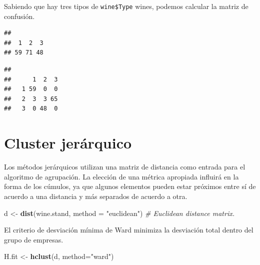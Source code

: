 \documentclass[]{book}
\newenvironment{Shaded}{\begin{snugshade}}{\end{snugshade}}
\newcommand{\KeywordTok}[1]{\textcolor[rgb]{0.13,0.29,0.53}{\textbf{#1}}}
\newcommand{\DataTypeTok}[1]{\textcolor[rgb]{0.13,0.29,0.53}{#1}}
\newcommand{\DecValTok}[1]{\textcolor[rgb]{0.00,0.00,0.81}{#1}}
\newcommand{\StringTok}[1]{\textcolor[rgb]{0.31,0.60,0.02}{#1}}
\newcommand{\CommentTok}[1]{\textcolor[rgb]{0.56,0.35,0.01}{\textit{#1}}}
\newcommand{\OperatorTok}[1]{\textcolor[rgb]{0.81,0.36,0.00}{\textbf{#1}}}
\newcommand{\NormalTok}[1]{#1}
\begin{document}
Sabiendo que hay tres tipos de \texttt{wine\$Type} wines, podemos
calcular la matriz de confusión.

\begin{Shaded}
\end{Shaded}

\begin{verbatim}
## 
##  1  2  3 
## 59 71 48
\end{verbatim}

\begin{Shaded}
\end{Shaded}

\begin{verbatim}
##    
##      1  2  3
##   1 59  0  0
##   2  3  3 65
##   3  0 48  0
\end{verbatim}

\section{Cluster jerárquico}\label{cluster-jeruxe1rquico}

Los métodos jerárquicos utilizan una matriz de distancia como entrada
para el algoritmo de agrupación. La elección de una métrica apropiada
influirá en la forma de los cúmulos, ya que algunos elementos pueden
estar próximos entre sí de acuerdo a una distancia y más separados de
acuerdo a otra.

\begin{Shaded}
\begin{Highlighting}[]
\NormalTok{d <-}\StringTok{ }\KeywordTok{dist}\NormalTok{(wine.stand, }\DataTypeTok{method =} \StringTok{"euclidean"}\NormalTok{) }\CommentTok{# Euclidean distance matrix.}
\end{Highlighting}
\end{Shaded}

El criterio de desviación mínima de Ward minimiza la desviación total
dentro del grupo de empresas.

\begin{Shaded}
\begin{Highlighting}[]
\NormalTok{H.fit <-}\StringTok{ }\KeywordTok{hclust}\NormalTok{(d, }\DataTypeTok{method=}\StringTok{"ward"}\NormalTok{)}
\end{Highlighting}
\end{Shaded}
\end{document}
